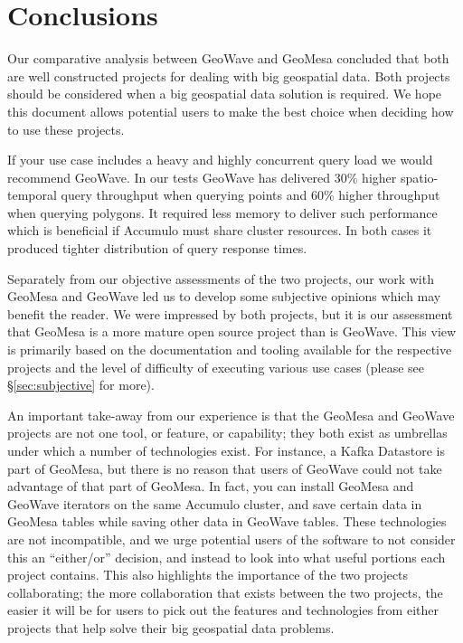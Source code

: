 \section{Conclusions}
\label{sec:conclusions}

Our comparative analysis between GeoWave and GeoMesa concluded that both are well constructed projects for dealing with big geospatial data.
Both projects should be considered when a big geospatial data solution is required.
We hope this document allows potential users to make the best choice when deciding how to use these projects.

If your use case includes a heavy and highly concurrent query load we would recommend GeoWave.
In our tests GeoWave has delivered $30$\% higher spatio-temporal query throughput when querying points and $60$\% higher throughput when querying polygons.
It required less memory to deliver such performance which is beneficial if Accumulo must share cluster resources.
In both cases it produced tighter distribution of query response times.

Separately from our objective assessments of the two projects,
our work with GeoMesa and GeoWave led us to develop some subjective opinions which may benefit the reader.
We were impressed by both projects, but it is our assessment that GeoMesa is a more mature open source project than is GeoWave.
This view is primarily based on the documentation and tooling available for the respective projects
and the level of difficulty of executing various use cases (please see \S \ref{sec:subjective} for more).

An important take-away from our experience is that the GeoMesa and GeoWave projects are not one tool, or feature, or capability; they both exist as umbrellas under which a number of technologies exist.
For instance, a Kafka Datastore is part of GeoMesa, but there is no reason that users of GeoWave could not take advantage of that part of GeoMesa.
In fact, you can install GeoMesa and GeoWave iterators on the same Accumulo cluster, and save certain data in GeoMesa tables while saving other data in GeoWave tables.
These technologies are not incompatible, and we urge potential users of the software to not consider this an ``either/or'' decision, and instead to look into what useful portions each project contains.
This also highlights the importance of the two projects collaborating; the more collaboration that exists between the two projects, the easier it will be for users to pick out the features and technologies from either projects that help solve their big geospatial data problems.


